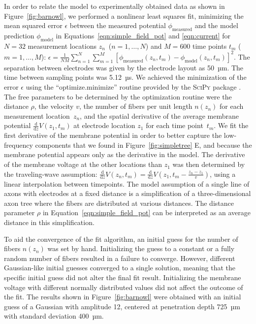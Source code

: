 \documentclass[]{elife}
\begin{document}
In order to relate the model to experimentally obtained data as shown in
Figure~\ref{fig:barnowl}, we performed a nonlinear least squares fit,
minimizing the mean squared error \(\epsilon\) between the measured
potential \(\phi_\text{measured}\) and the model prediction
\(\phi_\text{model}\) in Equations~\ref{eqn:simple_field_pot} and
\ref{eqn:current} for \({N=32}\) measurement locations
\(z_n\)~(\(n=1,\dots,N\)) and \({M=600}\) time points \(t_m\)
(\(m = 1,\dots,M\)):
\(\epsilon = \frac{1}{NM}\sum_{n=1}^{N}\sum_{m=1}^{M}\left[\phi_\text{measured}(z_n,t_m)-\phi_\text{model}(z_n,t_m)\right]^2\).
The separation between electrodes was given by the electrode layout as
50~µm. The time between sampling points was 5.12~µs. We achieved the
minimization of the error \(\epsilon\) using the ``optimize.minimize''
routine provided by the \textsc{SciPy} package \citep{scipy}. The free
parameters to be determined by the optimization routine were the
distance \(\rho\), the velocity \(v\), the number of fibers per unit
length \(n(z_n)\) for each measurement location~\(z_n\), and the spatial
derivative of the average membrane potential
\(\frac{\text{d}}{\text{d}z}V(z_1,t_m)\) at electrode location \(z_1\)
for each time point~\(t_m\). We fit the first derivative of the membrane
potential in order to better capture the low-frequency components that
we found in Figure~\ref{fig:simpletree} E, and because the membrane
potential appears only as the derivative in the model. The derivative of
the membrane voltage at the other locations than \(z_1\) was then
determined by the traveling-wave assumption:
\(\frac{\text{d}}{\text{d}z}V(z_n,t_m) = \frac{\text{d}}{\text{d}z}V(z_1,t_m-\frac{z_n-z_1}{v})\),
using a linear interpolation between timepoints. The model assumption of
a single line of axons with electrodes at a fixed distance is a
simplification of a three-dimensional axon tree where the fibers are
distributed at various distances. The distance parameter \(\rho\) in
Equation~\ref{eqn:simple_field_pot} can be interpreted as an average
distance in this simplification.

To aid the convergence of the fit algorithm, an initial guess for the
number of fibers \(n(z_n)\) was set by hand. Initializing the guess to a
constant or a fully random number of fibers resulted in a failure to
converge. However, different Gaussian-like initial guesses converged to
a single solution, meaning that the specific initial guess did not alter
the final fit result. Initializing the membrane voltage with different
normally distributed values did not affect the outcome of the fit. The
results shown in Figure~\ref{fig:barnowl} were obtained with an initial
guess of a Gaussian with amplitude 12, centered at penetration depth
725~µm with standard deviation 400~µm.
\end{document}

